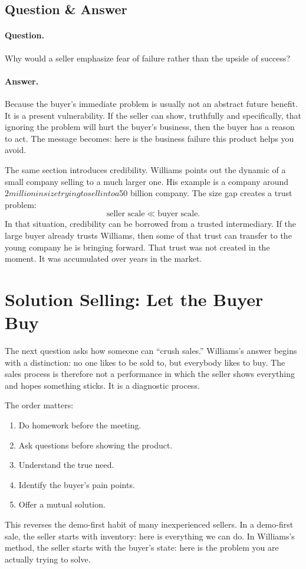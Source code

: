 \subsection{Question \& Answer}

\paragraph{Question.}
Why would a seller emphasize fear of failure rather than the upside of success?

\paragraph{Answer.}
Because the buyer's immediate problem is usually not an abstract future benefit. It is a present vulnerability. If the seller can show, truthfully and specifically, that ignoring the problem will hurt the buyer's business, then the buyer has a reason to act. The message becomes: here is the business failure this product helps you avoid.

The same section introduces credibility. Williams points out the dynamic of a small company selling to a much larger one. His example is a company around $2 million in size trying to sell into a $50 billion company. The size gap creates a trust problem:
\begin{equation}
\text{seller scale} \ll \text{buyer scale}.
\end{equation}
In that situation, credibility can be borrowed from a trusted intermediary. If the large buyer already trusts Williams, then some of that trust can transfer to the young company he is bringing forward. That trust was not created in the moment. It was accumulated over years in the market.

\section{Solution Selling: Let the Buyer Buy}

The next question asks how someone can ``crush sales.'' Williams's answer begins with a distinction: no one likes to be sold to, but everybody likes to buy. The sales process is therefore not a performance in which the seller shows everything and hopes something sticks. It is a diagnostic process.

The order matters:
\begin{enumerate}
\item Do homework before the meeting.
\item Ask questions before showing the product.
\item Understand the true need.
\item Identify the buyer's pain points.
\item Offer a mutual solution.
\end{enumerate}
This reverses the demo-first habit of many inexperienced sellers. In a demo-first sale, the seller starts with inventory: here is everything we can do. In Williams's method, the seller starts with the buyer's state: here is the problem you are actually trying to solve.

